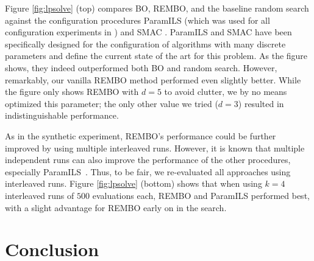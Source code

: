 \documentclass{article}
\newcommand{\note}[1]{}
\renewcommand{\note}[1]{~\\\frame{\begin{minipage}[c]{0.48\textwidth}\vspace{2pt}\center{#1}\vspace{2pt}\end{minipage}}\vspace{3pt}\\}
\begin{document}
Figure \ref{fig:lpsolve} (top) compares BO, REMBO, and the baseline random search against the configuration procedures ParamILS (which was used for all configuration experiments in \cite{Hutter:2010})
and SMAC \cite{Hutter:2011}. ParamILS and SMAC have been specifically designed for the configuration of algorithms with many discrete parameters and define the current state of the art for this problem. As the figure shows, they indeed outperformed both BO and random search.
However, remarkably, our vanilla REMBO method performed even slightly better. While the figure only shows REMBO with $d=5$ to avoid clutter, we by no means optimized this parameter; the only other value we tried ($d=3$) resulted in indistinguishable performance. 

As in the synthetic experiment, REMBO's performance could be further improved by using multiple interleaved runs.
However, it is known that multiple independent runs can also improve the performance of the other procedures, especially ParamILS~\cite{HutHooLey12-ParallelAC}. Thus, to be fair, we re-evaluated all approaches using interleaved runs. Figure \ref{fig:lpsolve} (bottom) shows that when using $k=4$ interleaved runs of $500$ evaluations each, REMBO and ParamILS performed best, with a slight advantage for REMBO early on in the search.




\section{Conclusion} \label{sec:conclusion}
\end{document}
